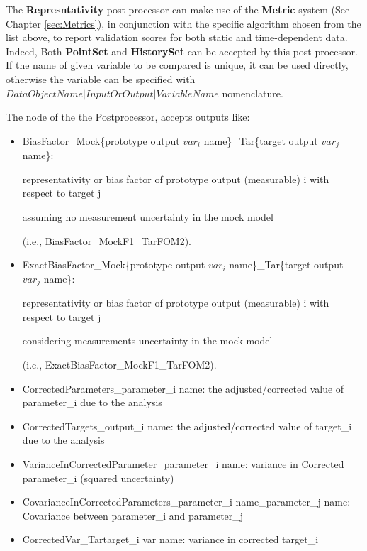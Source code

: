 The \textbf{Represntativity} post-processor can make use of the \textbf{Metric} system (See Chapter \ref{sec:Metrics}),
in conjunction with the specific algorithm chosen from the list above,
to report validation scores for both static and time-dependent data.
Indeed, Both \textbf{PointSet} and \textbf{HistorySet} can be accepted by this post-processor.
If the name of given variable to be compared is unique, it can be used directly, otherwise the variable can be specified
with $DataObjectName|InputOrOutput|VariableName$ nomenclature.

The  node of the  the  Postprocessor, accepts outputs like:
\begin{itemize}
  \item BiasFactor\_Mock\{prototype output $var_i$  name\}\_Tar\{target output $var_j$ name\}:

    representativity or bias factor of prototype output (measurable) i with respect to target j

    	assuming no measurement uncertainty in the mock model

    	 (i.e., BiasFactor\_MockF1\_TarFOM2).

  \item ExactBiasFactor\_Mock\{prototype output $var_i$ name\}\_Tar\{target output $var_j$ name\}:

   representativity or bias factor of prototype output (measurable) i with respect to target j

    considering measurements uncertainty in the mock model

     (i.e., ExactBiasFactor\_MockF1\_TarFOM2).

  \item CorrectedParameters\_{parameter_i name}: the adjusted/corrected value of parameter_i due to the analysis

  \item CorrectedTargets\_{output_i name}: the adjusted/corrected value of target_i due to the analysis

  \item VarianceInCorrectedParameter_{parameter_i name}: variance in Corrected parameter_i (squared uncertainty)

  \item CovarianceInCorrectedParameters\_{parameter_i name}\_{parameter_j name}: Covariance between parameter_i and parameter_j

  \item CorrectedVar\_Tar{target_i var name}: variance in corrected target_i


\end{itemize}
